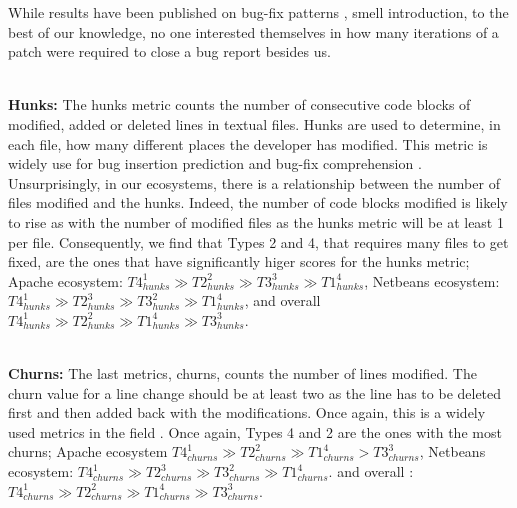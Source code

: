 While results have been published on bug-fix patterns \cite{Pan2008}, smell introduction\cite{Tufano2015, Eyolfson2011}, to the best of our knowledge, no one interested themselves in how many iterations of a patch were required to close a bug report besides us.

\\ \vspace{0.1cm} {\bf Hunks: } The hunks metric counts the number of consecutive code blocks of modified, added or deleted lines in textual files.
Hunks are used to determine, in each file, how many different places the developer has modified.
This metric is widely use for bug insertion prediction \cite{Kim2006,Jung2009, Rosen2015} and bug-fix comprehension \cite{Pan2008}.
Unsurprisingly, in our ecosystems, there is a relationship between the number of files modified and the hunks.
Indeed, the number of code blocks modified is likely to rise as with the number of modified files as the hunks metric will be at least 1 per file.
Consequently, we find that Types 2 and 4, that requires many files to get fixed, are the ones that have significantly higer scores for the hunks metric; Apache ecosystem:
$
T4_{hunks}^1
 \gg
T2_{hunks}^2
 \gg
T3_{hunks}^3
 \gg
T1_{hunks}^4
$,
Netbeans ecosystem:
$
T4_{hunks}^1
 \gg
T2_{hunks}^3
 \gg
T3_{hunks}^2
 \gg
T1_{hunks}^4
$,
and overall
$
T4_{hunks}^1
 \gg
T2_{hunks}^2
 \gg
T1_{hunks}^4
 \gg
T3_{hunks}^3
$.

\\ \vspace{0.1cm} {\bf Churns: } The last metrics, churns, counts the number of lines modified.
The churn value for a line change should be at least two as the line has to be deleted first and then added back with the modifications.
Once again, this is a widely used metrics in the field \cite{Kim2006,Pan2008,Jung2009, Rosen2015}.
Once again, Types 4 and 2 are the ones with the most churns; Apache ecosystem
$
T4_{churns}^1
 \gg
T2_{churns}^2
 \gg
T1_{churns}^4
 >
T3_{churns}^3
$,
Netbeans ecosystem:
$
T4_{churns}^1
 \gg
T2_{churns}^3
 \gg
T3_{churns}^2
 \gg
T1_{churns}^4
$.
and overall :
$
T4_{churns}^1
 \gg
T2_{churns}^2
 \gg
T1_{churns}^4
 \gg
T3_{churns}^3
$.



